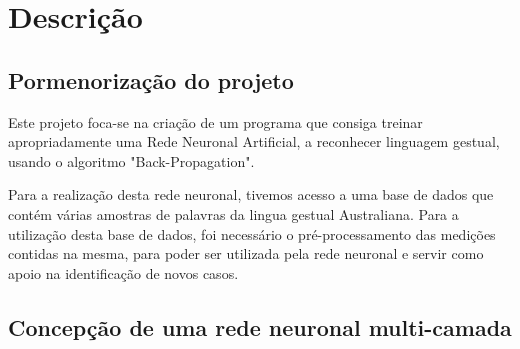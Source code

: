 \documentclass[10pt,a4paper]{article}
\begin{document}
\section{Descrição}

\subsection{Pormenorização do projeto}
\subitem

Este projeto foca-se na criação de um programa que consiga treinar apropriadamente uma Rede Neuronal Artificial, a reconhecer linguagem gestual, usando o algoritmo "Back-Propagation". 

Para a realização desta rede neuronal, tivemos acesso a uma base de dados que contém várias amostras de palavras da lingua gestual Australiana. Para a utilização desta base de dados, foi necessário o pré-processamento das medições contidas na mesma, para poder ser utilizada pela rede neuronal e servir como apoio na identificação de novos casos.

\subsection{Concepção de uma rede neuronal multi-camada}
\subitem
\end{document}

